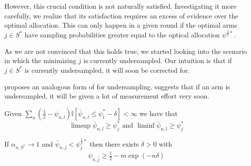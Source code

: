 However, this crucial condition is not naturally satisfied. Investigating it
more carefully, we realize that its satisfaction requires an excess of evidence
over the optimal allocation. This can only happen in a given round if the
optimal arms $j \in S^*$ have sampling probabilities greater equal to the
optical allocation $\psi^{\frac{1}{2}*}$.

As we are not convinced that this holds true, we started looking into the
scenario in which the minimizing $j$ is currently undersampled. Our intuition is
that if $j \in S^*$ is currently undersampled, it will soon be corrected
for.

 proposes an analogous form of
 for undersampling.
 suggests that if an arm is undersampled, it will
be given a lot of measurement effort very soon.
\begin{lemma}\label{lemma:limsup_undersampling}
  Given $\sum_n(\frac{1}{2} - \psi_{n, l}) \mathbb{I}[\bar{\psi}_{n, l} \leq
    \psi_l^* - \delta] < \infty$ we have that
  \[\limsup \bar{\psi}_{n, l} \geq \psi_j^* \text{ and } \liminf \bar{\psi}_{n,
      l} \geq \psi_j^*\]
\end{lemma}
\begin{lemma}\label{lemma:psi_undersampled}
  If $\alpha_{n, S^*} \rightarrow 1$ and $\bar{\psi}_{n, j} < \psi^{\frac{1}{2}*}_j$ then there exists $\delta > 0$
  with
  \begin{align}
    \psi_{n, \hat{j}} \geq \frac{1}{2} - m\exp(-n \delta)
  \end{align}
\end{lemma}

